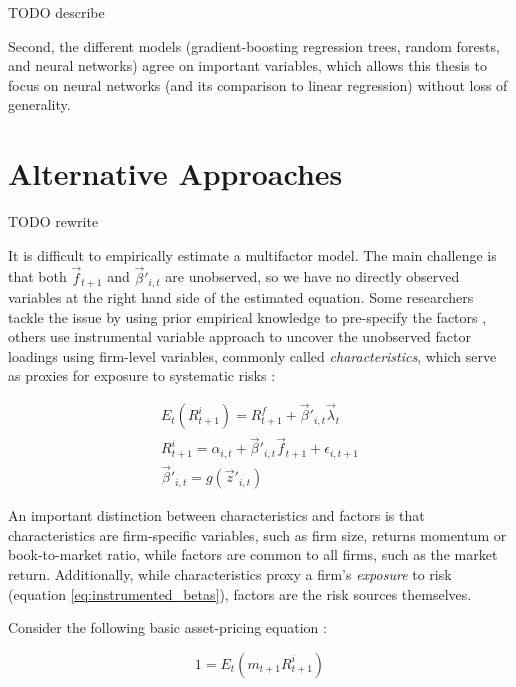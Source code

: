 			TODO describe 
			
			Second, the different models (gradient-boosting regression trees, random forests, and neural networks) agree on important variables, which allows this thesis to focus on neural networks (and its comparison to linear regression) without loss of generality.
	
 		
 		\section{Alternative Approaches}
 		
 			TODO rewrite
 			
	 		It is difficult to empirically estimate a multifactor model. The main challenge is that both $\vec{f}_{t+1}$ and $\vec{\beta}'_{i,t}$ are unobserved, so we have no directly observed variables at the right hand side of the estimated equation. Some researchers tackle the issue by using prior empirical knowledge to pre-specify the factors  \citep{fama1993common, fama2015five}, others use instrumental variable approach \citep{kelly2019characteristics} to uncover the unobserved factor loadings using firm-level variables, commonly called \textit{characteristics}, which serve as proxies for exposure to systematic risks \cite{kelly2019characteristics}:  
	 		
	 		\begin{align}
	 			E_t(R^i_{t+1}) = R^f_{t+1} + \vec{\beta}'_{i,t} \vec{\lambda}_{t}  \label{eq:ER_betalambda} \\
	 			R^i_{t+1} = \alpha_{i,t} + \vec{\beta}'_{i,t} \vec{f}_{t+1} + \epsilon_{i,t+1} \\
	 			\vec{\beta}'_{i,t} = g(\vec{z}'_{i,t}) \label{eq:instrumented_betas}
	 		\end{align}
	 		
	 		
	 		An important distinction between characteristics and factors is that characteristics are firm-specific variables, such as firm size, returns momentum or book-to-market ratio, while factors are common to all firms, such as the market return. Additionally, while characteristics proxy a firm's \textit{exposure} to risk (equation \ref{eq:instrumented_betas}), factors are the risk sources themselves. 
	 		
		 		  Consider the following basic asset-pricing equation \citep{cochrane2009asset}:
	 		
	 		\begin{equation}
	 			1 = E_t(m_{t+1} R_{t+1}^i ) \label{eq:1EmR}
	 		\end{equation} 
	 		
